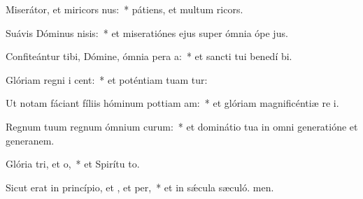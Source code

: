 \item Miserátor, et miricors nus:~* pátiens, et multum ricors.
\item Suávis Dóminus nisis:~* et miseratiónes ejus super ómnia ópe jus.
\item Confiteántur tibi, Dómine, ómnia pera a:~* et sancti tui benedí bi.
\item Glóriam regni i cent:~* et poténtiam tuam tur:
\item Ut notam fáciant fíliis hóminum pottiam am:~* et glóriam magnificéntiæ re i.
\item Regnum tuum regnum ómnium curum:~* et dominátio tua in omni generatióne et generanem.
\item Glória tri, et o,~* et Spirítu to.
\item Sicut erat in princípio, et , et per,~* et in sǽcula sæculó. men.
